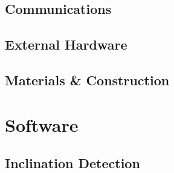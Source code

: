 \documentclass[11pt]{article}		%
\begin{document}
		\subsection{Communications}
		
		\subsection{External Hardware}
		
		
	
		\subsection{Materials \& Construction}
		
	
	\section{Software}
		
		\subsection{Inclination Detection}
		
\end{document}
